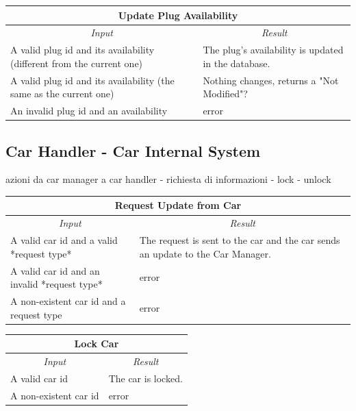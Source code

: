 \documentclass[english]{article}
\begin{document}
\begin{center}

	\begin{tabular}{ | p{6cm} | p{6cm} | }
		\hline 
		\multicolumn{2}{|c|}{\textbf{Update Plug Availability}} \\
		\hline
		\multicolumn{1}{|c|}{\textit{Input}} & \multicolumn{1}{c|}{\textit{Result}} \\
		\hline
		A valid plug id and its availability (different from the current one) & The plug's availability is updated in the database. \\
		\hline
		A valid plug id and its availability (the same as the current one) & Nothing changes, returns a "Not Modified"? \\
		\hline
		An invalid plug id and an availability & error \\
		\hline
	\end{tabular}
\end{center}

\subsection{Car Handler - Car Internal System}
azioni da car manager a car handler
- richiesta di informazioni
- lock
- unlock

\begin{center}

	\begin{tabular}{ | p{6cm} | p{6cm} | }
		\hline
		\multicolumn{2}{|c|}{\textbf{Request Update from Car}} \\
		\hline
		\multicolumn{1}{|c|}{\textit{Input}} & \multicolumn{1}{c|}{\textit{Result}} \\
		\hline
		A valid car id and a valid *request type* & The request is sent to the car and the car sends an update to the Car Manager. \\
		\hline
		A valid car id and an invalid *request type* & error \\
		\hline
		A non-existent car id and a request type & error \\
		\hline
	\end{tabular}
\end{center}

\begin{center}

	\begin{tabular}{ | p{6cm} | p{6cm} | }
		\hline 
		\multicolumn{2}{|c|}{\textbf{Lock Car}} \\
		\hline
		\multicolumn{1}{|c|}{\textit{Input}} & \multicolumn{1}{c|}{\textit{Result}} \\
		\hline
		A valid car id & The car is locked. \\
		\hline
		A non-existent car id  & error \\
		\hline
	\end{tabular}
\end{center}
\end{document}
